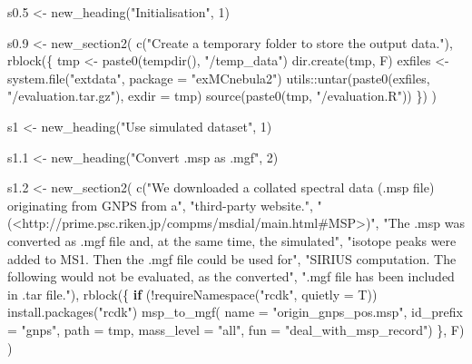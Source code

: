 \documentclass[
]{article}
\newenvironment{Shaded}{\begin{snugshade}}{\end{snugshade}}
\newcommand{\AttributeTok}[1]{\textcolor[rgb]{0.77,0.63,0.00}{#1}}
\newcommand{\ControlFlowTok}[1]{\textcolor[rgb]{0.13,0.29,0.53}{\textbf{#1}}}
\newcommand{\DecValTok}[1]{\textcolor[rgb]{0.00,0.00,0.81}{#1}}
\newcommand{\FloatTok}[1]{\textcolor[rgb]{0.00,0.00,0.81}{#1}}
\newcommand{\FunctionTok}[1]{\textcolor[rgb]{0.00,0.00,0.00}{#1}}
\newcommand{\NormalTok}[1]{#1}
\newcommand{\OtherTok}[1]{\textcolor[rgb]{0.56,0.35,0.01}{#1}}
\newcommand{\SpecialCharTok}[1]{\textcolor[rgb]{0.00,0.00,0.00}{#1}}
\newcommand{\StringTok}[1]{\textcolor[rgb]{0.31,0.60,0.02}{#1}}
\begin{document}
\begin{Shaded}
\begin{Highlighting}[]
\NormalTok{s0}\FloatTok{.5} \OtherTok{\textless{}{-}} \FunctionTok{new\_heading}\NormalTok{(}\StringTok{"Initialisation"}\NormalTok{, }\DecValTok{1}\NormalTok{)}

\NormalTok{s0}\FloatTok{.9} \OtherTok{\textless{}{-}} \FunctionTok{new\_section2}\NormalTok{(}
  \FunctionTok{c}\NormalTok{(}\StringTok{"Create a temporary folder to store the output data."}\NormalTok{),}
  \FunctionTok{rblock}\NormalTok{(\{}
\NormalTok{    tmp }\OtherTok{\textless{}{-}} \FunctionTok{paste0}\NormalTok{(}\FunctionTok{tempdir}\NormalTok{(), }\StringTok{"/temp\_data"}\NormalTok{)}
    \FunctionTok{dir.create}\NormalTok{(tmp, F)}
\NormalTok{    exfiles }\OtherTok{\textless{}{-}} \FunctionTok{system.file}\NormalTok{(}\StringTok{"extdata"}\NormalTok{, }\AttributeTok{package =} \StringTok{"exMCnebula2"}\NormalTok{)}
\NormalTok{    utils}\SpecialCharTok{::}\FunctionTok{untar}\NormalTok{(}\FunctionTok{paste0}\NormalTok{(exfiles, }\StringTok{"/evaluation.tar.gz"}\NormalTok{), }\AttributeTok{exdir =}\NormalTok{ tmp)}
    \FunctionTok{source}\NormalTok{(}\FunctionTok{paste0}\NormalTok{(tmp, }\StringTok{"/evaluation.R"}\NormalTok{))}
\NormalTok{  \})}
\NormalTok{)}

\NormalTok{s1 }\OtherTok{\textless{}{-}} \FunctionTok{new\_heading}\NormalTok{(}\StringTok{"Use simulated dataset"}\NormalTok{, }\DecValTok{1}\NormalTok{)}

\NormalTok{s1}\FloatTok{.1} \OtherTok{\textless{}{-}} \FunctionTok{new\_heading}\NormalTok{(}\StringTok{"Convert .msp as .mgf"}\NormalTok{, }\DecValTok{2}\NormalTok{)}

\NormalTok{s1}\FloatTok{.2} \OtherTok{\textless{}{-}} \FunctionTok{new\_section2}\NormalTok{(}
  \FunctionTok{c}\NormalTok{(}\StringTok{"We downloaded a collated spectral data (.msp file) originating from GNPS from a"}\NormalTok{,}
    \StringTok{"third{-}party website."}\NormalTok{, }\StringTok{"(\textless{}http://prime.psc.riken.jp/compms/msdial/main.html\#MSP\textgreater{})"}\NormalTok{,}
    \StringTok{"The .msp was converted as .mgf file and, at the same time, the simulated"}\NormalTok{,}
    \StringTok{"isotope peaks were added to MS1. Then the .mgf file could be used for"}\NormalTok{,}
    \StringTok{"SIRIUS computation. The following would not be evaluated, as the converted"}\NormalTok{,}
    \StringTok{".mgf file has been included in .tar file."}\NormalTok{),}
  \FunctionTok{rblock}\NormalTok{(\{}
    \ControlFlowTok{if}\NormalTok{ (}\SpecialCharTok{!}\FunctionTok{requireNamespace}\NormalTok{(}\StringTok{"rcdk"}\NormalTok{, }\AttributeTok{quietly =}\NormalTok{ T))}
      \FunctionTok{install.packages}\NormalTok{(}\StringTok{"rcdk"}\NormalTok{)}
    \FunctionTok{msp\_to\_mgf}\NormalTok{(}
      \AttributeTok{name =} \StringTok{"origin\_gnps\_pos.msp"}\NormalTok{,}
      \AttributeTok{id\_prefix =} \StringTok{"gnps"}\NormalTok{,}
      \AttributeTok{path =}\NormalTok{ tmp,}
      \AttributeTok{mass\_level =} \StringTok{"all"}\NormalTok{,}
      \AttributeTok{fun =} \StringTok{"deal\_with\_msp\_record"}\NormalTok{)}
\NormalTok{  \}, F)}
\NormalTok{)}


\end{Highlighting}
\end{Shaded}
\end{document}
